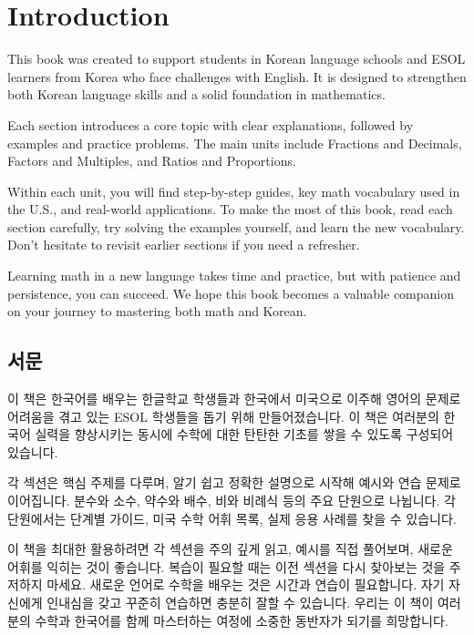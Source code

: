 \newpage\section*{Introduction}
This book was created to support students in Korean language schools and 
ESOL learners from Korea who face challenges with English. It is designed to 
strengthen both Korean language skills and a solid foundation in mathematics.

Each section introduces a core topic with clear explanations, followed by 
examples and practice problems. The main units include Fractions and Decimals, 
Factors and Multiples, and Ratios and Proportions.

Within each unit, you will find step-by-step guides, key math vocabulary used 
in the U.S., and real-world applications. To make the most of this book, read 
each section carefully, try solving the examples yourself, and learn the new 
vocabulary. Don't hesitate to revisit earlier sections if you need a refresher.

Learning math in a new language takes time and practice, but with patience 
and persistence, you can succeed. We hope this book becomes a valuable 
companion on your journey to mastering both math and Korean.

\subsection*{서문}
이 책은 한국어를 배우는 한글학교 학생들과 한국에서 미국으로 이주해 영어의 문제로 
어려움을 겪고 있는 ESOL 학생들을 돕기 위해 만들어졌습니다. 이 책은 여러분의 한국어 
실력을 향상시키는 동시에 수학에 대한 탄탄한 기초를 쌓을 수 있도록 구성되어 있습니다.

각 섹션은 핵심 주제를 다루며, 알기 쉽고 정확한 설명으로 시작해 예시와 연습 문제로 
이어집니다. 분수와 소수, 약수와 배수, 비와 비례식 등의 주요 단원으로 나뉩니다. 
각 단원에서는 단계별 가이드, 미국 수학 어휘 목록, 실제 응용 사례를 찾을 수 있습니다.

이 책을 최대한 활용하려면 각 섹션을 주의 깊게 읽고, 예시를 직접 풀어보며, 새로운 
어휘를 익히는 것이 좋습니다. 복습이 필요할 때는 이전 섹션을 다시 찾아보는 것을 주저하지 
마세요. 새로운 언어로 수학을 배우는 것은 시간과 연습이 필요합니다. 자기 자신에게 
인내심을 갖고 꾸준히 연습하면 충분히 잘할 수 있습니다. 우리는 이 책이 여러분의 
수학과 한국어를 함께 마스터하는 여정에 소중한 동반자가 되기를 희망합니다.